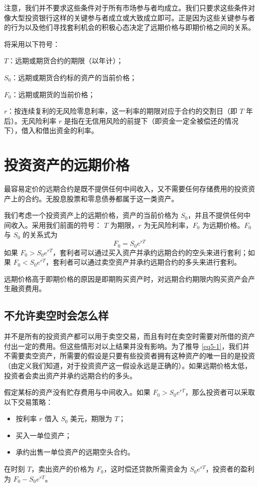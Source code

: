 注意，我们并不要求这些条件对于所有市场参与者均成立。我们只要求这些条件对像大型投资银行这样的关键参与者成立或大致成立即可。正是因为这些关键参与者的行为以及他们寻找套利机会的积极心态决定了远期价格与即期价格之间的关系。

将采用以下符号：

$T$：远期或期货合约的期限（以年计）；

$S_0$：远期或期货合约标的资产的当前价格；

$F_0$：远期或期货的当前价格；

$r$：按连续复利的无风险零息利率，这一利率的期限对应于合约的交割日（即 $T$ 年后）。无风险利率 $r$ 是指在无信用风险的前提下（即资金一定全被偿还的情况下），借入和借出资金的利率。
\section{投资资产的远期价格}
最容易定价的远期合约是既不提供任何中间收入，又不需要任何存储费用的投资资产上的合约。无股息股票和零息债券都属于这一类资产。

我们考虑一个投资资产上的远期价格，资产的当前价格为 $S_0$，并且不提供任何中间收入。采用我们前面的符号： $T$ 为期限，$r$ 为无风险利率，$F_0$ 为远期价格。$F_0$ 与 $S_0$ 的关系式为
\begin{equation}\label{eq5-1}
    F_0=S_0e^{rT}
\end{equation}
如果 $F_0 > S_0e^{rT}$，套利者可以通过买入资产并承约远期合约的空头来进行套利；如果 $F_0 < S_0e^{rT}$，套利者可以通过卖空资产并承约远期合约的多头来进行套利。

远期价格高于即期价格的原因是即期购买资产时，对远期合约期限内购买资产会产生融资费用。
\subsection{不允许卖空时会怎么样}
并不是所有的投资资产都可以用于卖空交易，而且有时在卖空时需要对所借的资产付出一定的费用。但这些情形对以上结果并没有影响。为了推导 \autoref{eq5-1}，我们并不需要卖空资产，所需要的假设是只要有些投资者拥有这种资产的唯一目的是投资（由定义我们知道，对于投资资产这一假设永远是正确的）。如果远期价格太低，投资者会卖出资产并承约远期合约的多头。

假定某标的资产没有贮存费用与中间收入。如果 $F_0>S_0e^{rT}$，那么投资者可以采取以下交易策略：
\begin{itemize}
    \item 按利率 $r$ 借入 $S_0$ 美元，期限为 $T$；
    \item 买入一单位资产；
    \item 承约出售一单位资产的远期空头合约。
\end{itemize}
在时刻 $T$，卖出资产的价格为 $F_0$，这时偿还贷款所需资金为 $S_0e^{rT}$，投资者的盈利为 $F_0-S_0e^{rT}$。

